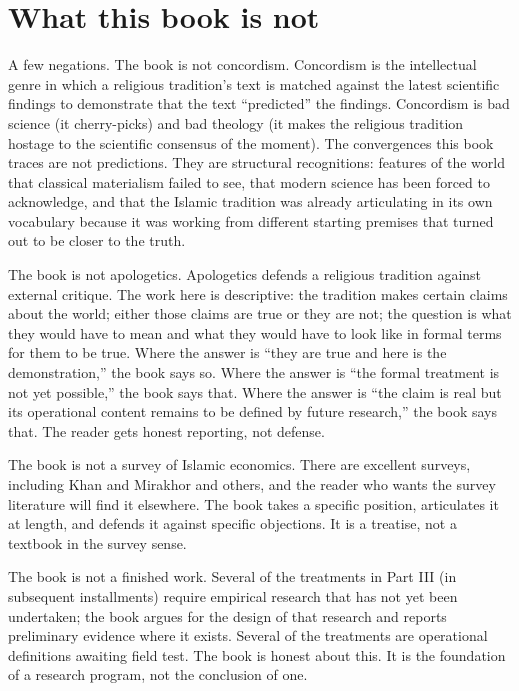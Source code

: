\section*{What this book is not}

A few negations. The book is not concordism. Concordism is the
intellectual genre in which a religious tradition's text is matched
against the latest scientific findings to demonstrate that the text
``predicted'' the findings. Concordism is bad science (it cherry-picks)
and bad theology (it makes the religious tradition hostage to the
scientific consensus of the moment). The convergences this book traces
are not predictions. They are structural recognitions: features of the
world that classical materialism failed to see, that modern science has
been forced to acknowledge, and that the Islamic tradition was already
articulating in its own vocabulary because it was working from
different starting premises that turned out to be closer to the truth.

The book is not apologetics. Apologetics defends a religious
tradition against external critique. The work here is descriptive: the
tradition makes certain claims about the world; either those claims are
true or they are not; the question is what they would have to mean and
what they would have to look like in formal terms for them to be true.
Where the answer is ``they are true and here is the demonstration,''
the book says so. Where the answer is ``the formal treatment is not
yet possible,'' the book says that. Where the answer is ``the claim is
real but its operational content remains to be defined by future
research,'' the book says that. The reader gets honest reporting, not
defense.

The book is not a survey of Islamic economics. There are excellent
surveys, including Khan and Mirakhor and others, and the reader who
wants the survey literature will find it elsewhere. The book takes a
specific position, articulates it at length, and defends it against
specific objections. It is a treatise, not a textbook in the survey
sense.

The book is not a finished work. Several of the treatments in
Part III (in subsequent installments) require empirical research that
has not yet been undertaken; the book argues for the design of that
research and reports preliminary evidence where it exists. Several of
the treatments are operational definitions awaiting field test. The
book is honest about this. It is the foundation of a research program,
not the conclusion of one.


